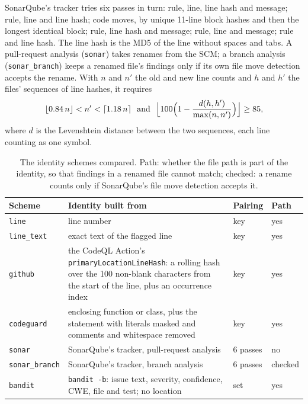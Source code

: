\documentclass[conference]{IEEEtran}
\begin{document}
SonarQube's tracker tries six passes in turn: rule, line, line hash and message; rule,
line and line hash; code moves, by unique 11-line block hashes and then the longest
identical block; rule, line hash and message; rule, line and message; rule and line
hash. The line hash is the MD5 of the line without spaces and tabs. A pull-request
analysis (\texttt{sonar}) takes renames from the SCM; a branch analysis
(\texttt{sonar\_branch}) keeps a renamed file's findings only if its own file move
detection accepts the rename. With $n$ and $n'$ the old and new line counts and $h$ and
$h'$ the files' sequences of line hashes, it requires
\begin{equation}\label{eq:move}
\lfloor 0.84\,n \rfloor < n' < \lceil 1.18\,n \rceil
\ \ \text{and}\ \
\Bigl\lfloor 100 \Bigl(1 - \frac{d(h, h')}{\max(n, n')}\Bigr) \Bigr\rfloor \ge 85,
\end{equation}
where $d$ is the Levenshtein distance between the two sequences, each line counting as
one symbol.

\begin{table}[t]
\centering
\caption{The identity schemes compared. Path: whether the file path is part of the
identity, so that findings in a renamed file cannot match; checked: a rename
counts only if SonarQube's file move detection accepts it.}
\label{tab:schemes}
\footnotesize
\setlength{\tabcolsep}{3pt}
\begin{tabularx}{\columnwidth}{@{}l>{\raggedright\arraybackslash}Xll@{}}
\toprule
Scheme & Identity built from & Pairing & Path \\
\midrule
\texttt{line} & line number & key & yes \\
\texttt{line\_text} & exact text of the flagged line & key & yes \\
\texttt{github} & the CodeQL Action's \texttt{primaryLocationLineHash}: a rolling hash over the
  100 non-blank characters from the start of the line, plus an occurrence index & key &
  yes \\
\texttt{codeguard} & enclosing function or class, plus the statement with literals
  masked and comments and whitespace removed & key & yes \\
\texttt{sonar} & SonarQube's tracker, pull-request analysis & 6 passes & no \\
\texttt{sonar\_branch} & SonarQube's tracker, branch analysis & 6 passes & checked \\
\texttt{bandit} & \texttt{bandit -b}: issue text, severity, confidence, CWE, file and
  test; no location & set & yes \\
\bottomrule
\end{tabularx}
\end{table}
\end{document}
